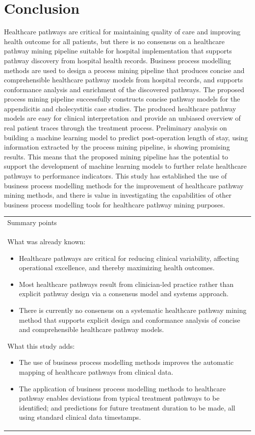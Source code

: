 \documentclass{elsarticle}
\begin{document}
\section{Conclusion}
Healthcare pathways are critical for maintaining quality of care and improving health outcome for all patients, but there is no consensus on a healthcare pathway mining pipeline suitable for hospital implementation that supports pathway discovery from hospital health records. Business process modelling methods are used to design a process mining pipeline that produces concise and comprehensible healthcare pathway models from hospital records, and supports conformance analysis and enrichment of the discovered pathways. The proposed process mining pipeline successfully constructs concise pathway models for the appendicitis and cholecystitis case studies. The produced healthcare pathway models are easy for clinical interpretation and provide an unbiased overview of real patient traces through the treatment process. Preliminary analysis on building a machine learning model to predict post-operation length of stay, using information extracted by the process mining pipeline, is showing promising results. This means that the proposed mining pipeline has the potential to support the development of machine learning models to further relate healthcare pathways to performance indicators. This study has established the use of business process modelling methods for the improvement of healthcare pathway mining methods, and there is value in investigating the capabilities of other business process modelling tools for healthcare pathway mining purposes.

\begin{table}[h]
\centering
\begin{tabular}{p{11cm}} 
 Summary points\\ 
 What was already known:
 \begin{itemize}
     \item Healthcare pathways are critical for reducing clinical variability, affecting operational excellence, and thereby maximizing health outcomes.
     \item  Most healthcare pathways result from clinician-led practice rather than explicit pathway design via a consensus model and systems approach. 
     \item  There is currently no consensus on a systematic healthcare pathway mining method that supports explicit design and conformance analysis of concise and comprehensible healthcare pathway models.
 \end{itemize}
 What this study adds:
 \begin{itemize}
     \item  The use of business process modelling methods improves the automatic mapping of healthcare pathways from clinical data.
     \item The application of business process modelling methods to healthcare pathway enables deviations from typical treatment pathways to be identified; and predictions for future treatment duration to be made, all using standard clinical data timestamps. 
 \end{itemize}
\end{tabular}
\end{table}
\end{document}
